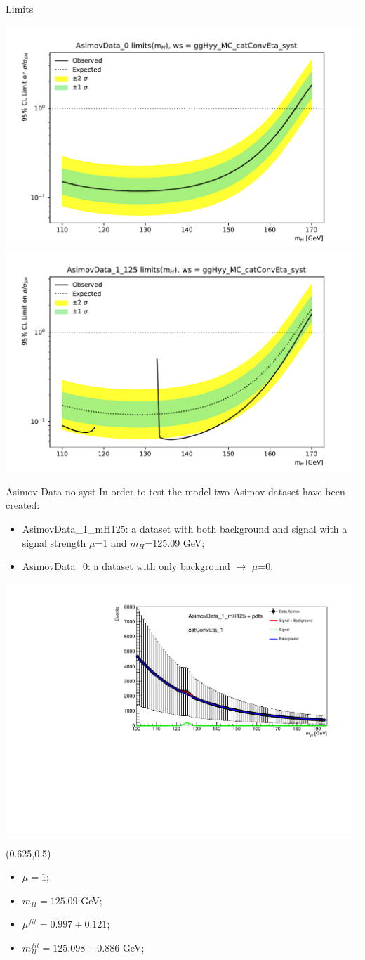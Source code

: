 \documentclass[10pt,UKenglish, leqno, xcolor = dvipsnames]{beamer}
\begin{document}
		\begin{frame}{Limits}
			\vfill
			\begin{center}
				\includegraphics[width=.475\textwidth]{Pres_Images/plot_AsimovData_0_ggHyy_MC_catConvEta_syst.pdf}
				\includegraphics[width=.475\textwidth]{Pres_Images/plot_AsimovData_1_125_ggHyy_MC_catConvEta_syst.pdf}
			\end{center}
			\vfill
		\end{frame}
	
		\begin{frame}{Asimov Data no syst}
			\vfill
			In order to test the model two Asimov dataset have been created:
			\begin{itemize}
				\item AsimovData\_1\_mH125: a dataset with both background and signal with a signal strength $\mu$=1  and $m_H$=125.09 GeV;
				\item AsimovData\_0: a dataset with only background $\to$ $\mu$=0.
			\end{itemize}
			\includegraphics[width=.7\textwidth]{Pres_Images/check_Asimov_catConvEta_1.pdf}
			
			\begin{textblock}{}(0.625,0.5)
				\small
				\begin{itemize}
					\item $\mu = 1$;
					\item $m_H = 125.09$ GeV;
					\item $\mu^{fit} = 0.997 \pm 0.121$;
					\item $m^{fit}_H = 125.098 \pm 0.886$ GeV;
				\end{itemize}
			\end{textblock}
			
			
		\end{frame}
	
\end{document}
